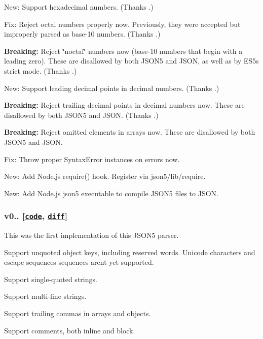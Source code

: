 \begin{DoxyItemize}
\item New\+: Support hexadecimal numbers. (Thanks \href{https://github.com/MaxNanasy}{\tt }.)
\item Fix\+: Reject octal numbers properly now. Previously, they were accepted but improperly parsed as base-\/10 numbers. (Thanks \href{https://github.com/MaxNanasy}{\tt }.)
\item {\bfseries Breaking\+:} Reject \char`\"{}noctal\char`\"{} numbers now (base-\/10 numbers that begin with a leading zero). These are disallowed by both J\+S\+O\+N5 and J\+S\+ON, as well as by E\+S5\textquotesingle{}s strict mode. (Thanks \href{https://github.com/MaxNanasy}{\tt }.)
\item New\+: Support leading decimal points in decimal numbers. (Thanks \href{https://github.com/MaxNanasy}{\tt }.)
\item {\bfseries Breaking\+:} Reject trailing decimal points in decimal numbers now. These are disallowed by both J\+S\+O\+N5 and J\+S\+ON. (Thanks \href{https://github.com/MaxNanasy}{\tt }.)
\item {\bfseries Breaking\+:} Reject omitted elements in arrays now. These are disallowed by both J\+S\+O\+N5 and J\+S\+ON.
\item Fix\+: Throw proper {\ttfamily Syntax\+Error} instances on errors now.
\item New\+: Add Node.\+js {\ttfamily require()} hook. Register via {\ttfamily json5/lib/require}.
\item New\+: Add Node.\+js {\ttfamily json5} executable to compile J\+S\+O\+N5 files to J\+S\+ON.
\end{DoxyItemize}

\subsubsection*{v0.. \mbox{[}\href{https://github.com/aseemk/json5/tree/v0.0.1}{\tt code}, \href{https://github.com/aseemk/json5/compare/v0.0.0...v0.0.1}{\tt diff}\mbox{]}}

This was the first implementation of this J\+S\+O\+N5 parser.


\begin{DoxyItemize}
\item Support unquoted object keys, including reserved words. Unicode characters and escape sequences sequences aren\textquotesingle{}t yet supported.
\item Support single-\/quoted strings.
\item Support multi-\/line strings.
\item Support trailing commas in arrays and objects.
\item Support comments, both inline and block.
\end{DoxyItemize}

